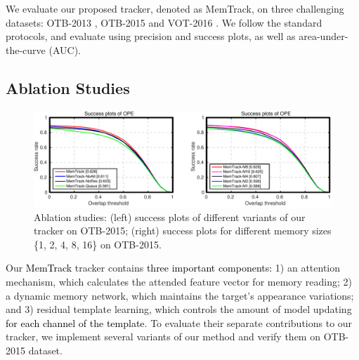 \documentclass[runningheads]{llncs}
\newcommand{\abc}[1]{\textcolor{black}{#1}}
\begin{document}
We evaluate our proposed tracker, denoted as MemTrack, on three challenging datasets: OTB-2013 \cite{Wu2013}, OTB-2015 \cite{Wu2015} and VOT-2016 \cite{Kristan2016}.  We follow the standard protocols, and evaluate using precision and success plots, as well as area-under-the-curve (AUC).

\subsection{Ablation Studies}\label{abla}


\begin{figure}[t]
	\begin{center}
		\includegraphics[width=0.85\linewidth]{ablation-tb100.pdf}
	\end{center}
	\vspace{-5mm}
	\caption{Ablation studies: (left) success plots of different variants of our tracker on OTB-2015; (right) success plots for different memory sizes \{1, 2, 4, 8, 16\} on OTB-2015. 
	}
	\vspace{-2mm}
	\label{fig:7}
\end{figure}

Our \abc{MemTrack} tracker contains \abc{three important components:} 1) an attention mechanism, which calculates the attended feature vector for memory reading; 2) a dynamic memory network, which maintains the target's appearance variations; and 3) residual template learning, which controls the amount of model updating \abc{for each channel of the template}. To evaluate their separate contributions to our tracker, we implement several variants of our method and verify them on OTB-2015 dataset. 
\end{document}
